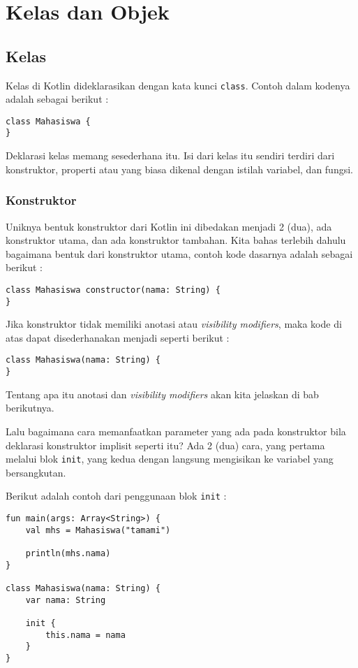 \chapter{Kelas dan Objek}

\section{Kelas}

Kelas di Kotlin dideklarasikan dengan kata kunci \texttt{class}. Contoh dalam kodenya adalah sebagai berikut :

\begin{lstlisting}
class Mahasiswa {
}
\end{lstlisting}

Deklarasi kelas memang sesederhana itu. Isi dari kelas itu sendiri terdiri dari konstruktor, properti atau yang biasa dikenal dengan istilah variabel, dan fungsi.

\subsection{Konstruktor}

Uniknya bentuk konstruktor dari Kotlin ini dibedakan menjadi 2 (dua), ada konstruktor utama, dan ada konstruktor tambahan. Kita bahas terlebih dahulu bagaimana bentuk dari konstruktor utama, contoh kode dasarnya adalah sebagai berikut :

\begin{lstlisting}
class Mahasiswa constructor(nama: String) {
}
\end{lstlisting}

Jika konstruktor tidak memiliki anotasi atau \textit{visibility modifiers}, maka kode di atas dapat disederhanakan menjadi seperti berikut :

\begin{lstlisting}
class Mahasiswa(nama: String) {
}
\end{lstlisting}

Tentang apa itu anotasi dan \textit{visibility modifiers} akan kita jelaskan di bab berikutnya. 

Lalu bagaimana cara memanfaatkan parameter yang ada pada konstruktor bila deklarasi konstruktor implisit seperti itu? Ada 2 (dua) cara, yang pertama melalui blok \texttt{init}, yang kedua dengan langsung mengisikan ke variabel yang bersangkutan. 

Berikut adalah contoh dari penggunaan blok \texttt{init} :

\begin{lstlisting}
fun main(args: Array<String>) {
	val mhs = Mahasiswa("tamami")
	
	println(mhs.nama)
}

class Mahasiswa(nama: String) {
	var nama: String
	
	init {
		this.nama = nama
	}
}
\end{lstlisting}

